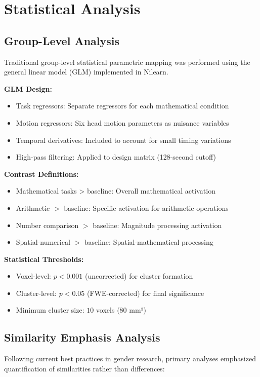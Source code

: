 \section{Statistical Analysis}
\subsection{Group-Level Analysis}
Traditional group-level statistical parametric mapping was performed using the general linear model (GLM) implemented in Nilearn.

\vspace{0.5\baselineskip}
\noindent
\textbf{GLM Design:}
\begin{itemize}
\item Task regressors: Separate regressors for each mathematical condition
\item Motion regressors: Six head motion parameters as nuisance variables
\item Temporal derivatives: Included to account for small timing variations
\item High-pass filtering: Applied to design matrix (128-second cutoff)
\end{itemize}

\noindent
\textbf{Contrast Definitions:}
\begin{itemize}
\item Mathematical tasks > baseline: Overall mathematical activation
\item Arithmetic $>$ baseline: Specific activation for arithmetic operations
\item Number comparison $>$ baseline: Magnitude processing activation
\item Spatial-numerical $>$ baseline: Spatial-mathematical processing
\end{itemize}

\noindent
\textbf{Statistical Thresholds:}
\begin{itemize}
\item Voxel-level: $p < 0.001$ (uncorrected) for cluster formation
\item Cluster-level: $p < 0.05$ (FWE-corrected) for final significance
\item Minimum cluster size: $10$ voxels (80 mm³)
\end{itemize}

\subsection{Similarity Emphasis Analysis}
Following current best practices in gender research, primary analyses emphasized quantification of similarities rather than differences:

